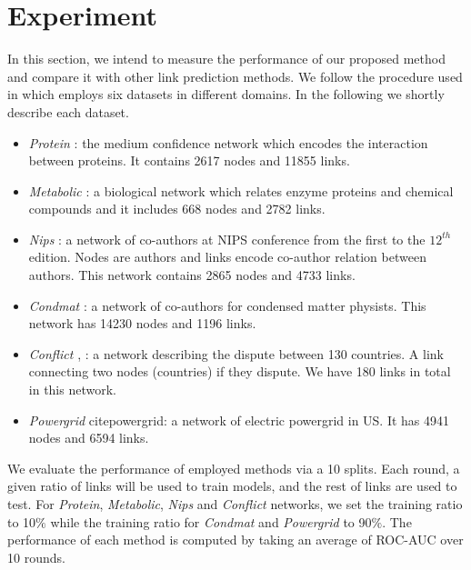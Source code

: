\documentclass[runningheads,a4paper]{llncs}
\begin{document}
\section{Experiment}
In this section, we intend to measure the performance of our proposed method and compare it with other link prediction methods. We follow the procedure used in \cite{matrix-factorization} which employs six datasets in different domains. In the following we shortly describe each dataset.
\begin{itemize}
\item \textit{Protein }\cite{protein-protein}: the medium confidence network which encodes the interaction between proteins. It contains 2617 nodes and 11855 links.

\item \textit{Metabolic} \cite{metabolic}: a biological network which relates enzyme proteins and chemical compounds and it includes 668 nodes and 2782 links.

\item \textit{Nips} \cite{nips}: a network of co-authors at NIPS conference from the first to the $12^{th}$ edition. Nodes are authors and links encode co-author relation between authors. This network contains 2865 nodes and 4733 links. 

\item \textit{Condmat} \cite{condmat}: a network of co-authors for condensed matter physists. This network has 14230 nodes and 1196 links.

\item \textit{Conflict} \cite{conflict1}, \cite{conflict2}: a network describing the dispute between 130 countries. A link connecting two nodes (countries) if they dispute. We have 180 links in total in this network.

\item \textit{Powergrid} cite{powergrid}: a network of electric powergrid in US. It has 4941 nodes and 6594 links.
\end{itemize}

We evaluate the performance of employed methods via a 10 splits. Each round, a given ratio of links will be used to train models, and the rest of links are used to test. For \textit{Protein}, \textit{Metabolic}, \textit{Nips} and \textit{Conflict} networks, we set the training ratio to 10$\%$ while the training ratio for \textit{Condmat} and \textit{Powergrid} to 90$\%$. The performance of each method is computed by taking an average of ROC-AUC over 10 rounds.
\end{document}
